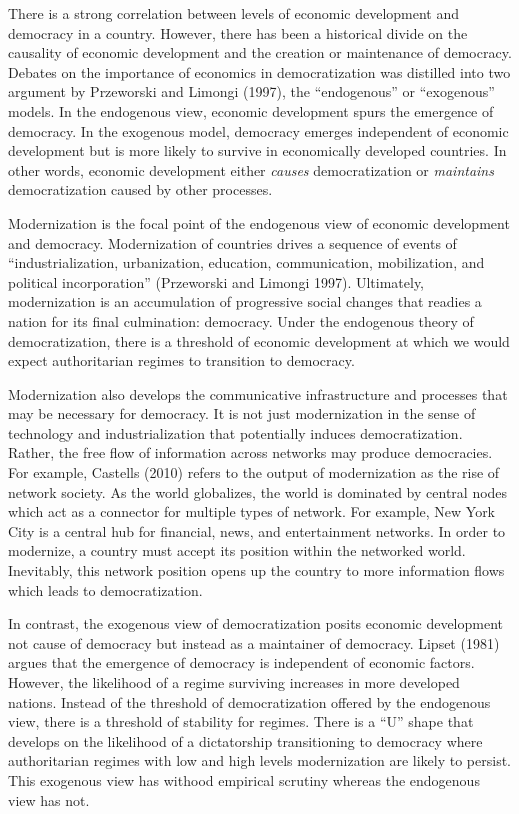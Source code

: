\documentclass[12pt,]{article}
\begin{document}
There is a strong correlation between levels of economic development and
democracy in a country. However, there has been a historical divide on
the causality of economic development and the creation or maintenance of
democracy. Debates on the importance of economics in democratization was
distilled into two argument by Przeworski and Limongi (1997), the
``endogenous'' or ``exogenous'' models. In the endogenous view, economic
development spurs the emergence of democracy. In the exogenous model,
democracy emerges independent of economic development but is more likely
to survive in economically developed countries. In other words, economic
development either \emph{causes} democratization or \emph{maintains}
democratization caused by other processes.

Modernization is the focal point of the endogenous view of economic
development and democracy. Modernization of countries drives a sequence
of events of ``industrialization, urbanization, education,
communication, mobilization, and political incorporation'' (Przeworski
and Limongi 1997). Ultimately, modernization is an accumulation of
progressive social changes that readies a nation for its final
culmination: democracy. Under the endogenous theory of democratization,
there is a threshold of economic development at which we would expect
authoritarian regimes to transition to democracy.

Modernization also develops the communicative infrastructure and
processes that may be necessary for democracy. It is not just
modernization in the sense of technology and industrialization that
potentially induces democratization. Rather, the free flow of
information across networks may produce democracies. For example,
Castells (2010) refers to the output of modernization as the rise of
network society. As the world globalizes, the world is dominated by
central nodes which act as a connector for multiple types of network.
For example, New York City is a central hub for financial, news, and
entertainment networks. In order to modernize, a country must accept its
position within the networked world. Inevitably, this network position
opens up the country to more information flows which leads to
democratization.

In contrast, the exogenous view of democratization posits economic
development not cause of democracy but instead as a maintainer of
democracy. Lipset (1981) argues that the emergence of democracy is
independent of economic factors. However, the likelihood of a regime
surviving increases in more developed nations. Instead of the threshold
of democratization offered by the endogenous view, there is a threshold
of stability for regimes. There is a ``U'' shape that develops on the
likelihood of a dictatorship transitioning to democracy where
authoritarian regimes with low and high levels modernization are likely
to persist. This exogenous view has withood empirical scrutiny whereas
the endogenous view has not.
\end{document}
